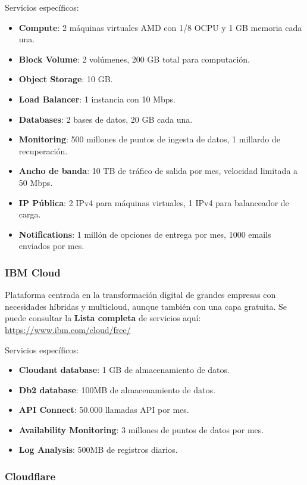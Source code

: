 Servicios específicos:
\begin{itemize}
	\item \textbf{Compute}: 2 máquinas virtuales AMD con 1/8 OCPU y 1 GB memoria cada una.
	\item \textbf{Block Volume}: 2 volúmenes, 200 GB total para computación.
	\item \textbf{Object Storage}: 10 GB.
	\item \textbf{Load Balancer}: 1 instancia con 10 Mbps.
	\item \textbf{Databases}: 2 bases de datos, 20 GB cada una.
	\item \textbf{Monitoring}: 500 millones de puntos de ingesta de datos, 1 millardo de recuperación.
	\item \textbf{Ancho de banda}: 10 TB de tráfico de salida por mes, velocidad limitada a 50 Mbps.
	\item \textbf{IP Pública}: 2 IPv4 para máquinas virtuales, 1 IPv4 para balanceador de carga.
	\item \textbf{Notifications}: 1 millón de opciones de entrega por mes, 1000 emails enviados por mes.
\end{itemize}

\subsubsection*{IBM Cloud}

Plataforma centrada en la transformación digital de grandes empresas con necesidades híbridas y multicloud, aunque también con una capa gratuita. Se puede consultar la \textbf{Lista completa} de servicios aquí: \url{https://www.ibm.com/cloud/free/}

Servicios específicos:
\begin{itemize}
	\item \textbf{Cloudant database}: 1 GB de almacenamiento de datos.
	\item \textbf{Db2 database}: 100MB de almacenamiento de datos.
	\item \textbf{API Connect}: 50.000 llamadas API por mes.
	\item \textbf{Availability Monitoring}: 3 millones de puntos de datos por mes.
	\item \textbf{Log Analysis}: 500MB de registros diarios.
\end{itemize}

\subsubsection*{Cloudflare}

